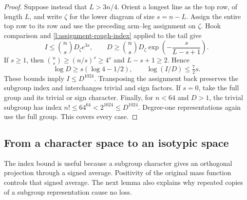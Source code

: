 \begin{proof}
Suppose instead that $L>3n/4$.  Orient a longest line as the top row,
of length $L$, and write $\zeta$ for the lower diagram of size
$s=n-L$.  Assign the entire top row to its row and use the preceding
arm--leg assignment on $\zeta$.  Hook comparison and
\eqref{l:assignment-rough-index} applied to the tail give
\[
 I\le\binom nsD_\zeta e^{3s},\qquad
 D\ge\binom nsD_\zeta
              \exp\left(-\frac{s}{L-s+1}\right).
\]
If $s\ge1$, then $\binom ns\ge(n/s)^s\ge4^s$ and
$L-s+1\ge2$.  Hence
\[
 \log D\ge s(\log4-1/2),\qquad
 \log(I/D)\le\tfrac72s.
\]
These bounds imply $I\le D^{1024}$.  Transposing the assignment
back preserves the subgroup index and interchanges trivial and sign
factors.  If $s=0$, take the full group and its trivial or sign
character.  Finally, for $n<64$ and $D>1$, the trivial subgroup has
index $n!\le64^{64}<2^{1024}\le D^{1024}$.  Degree-one
representations again use the full group.  This covers every case.
\end{proof}

\subsection{From a character space to an isotypic space}

The index bound is useful because a subgroup character gives an
orthogonal projection through a signed average.  Positivity of the
original mass function controls that signed average.  The next lemma
also explains why repeated copies of a subgroup representation cause
no loss.

